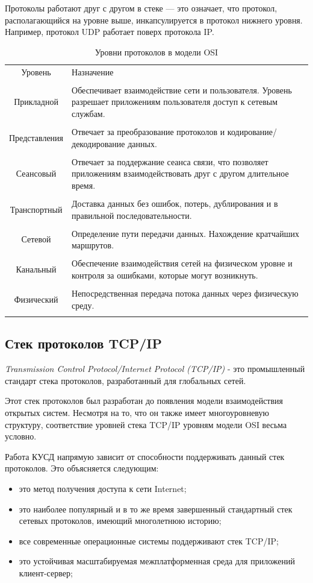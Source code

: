 Протоколы работают друг с другом в стеке --- это означает, что протокол, располагающийся на уровне выше, инкапсулируется в протокол нижнего уровня. Например, протокол UDP работает поверх протокола IP.

\begin{table}[h!]
\caption{Уровни протоколов в модели OSI}
\label{osi}
	\begin{tabular}{|c| >{\centering} m{120mm} <{\centering}|}
	\hline
	Уровень & Назначение \\
	\tabularnewline
	\hline
	Прикладной & Обеспечивает взаимодействие сети и пользователя. Уровень разрешает приложениям пользователя доступ к сетевым службам.\\
	\tabularnewline
	\hline
	Представления & Отвечает за преобразование протоколов и кодирование/декодирование данных.\\
	\tabularnewline
	\hline	
	Сеансовый & Отвечает за поддержание сеанса связи, что позволяет приложениям взаимодействовать друг с другом длительное время.\\
	\tabularnewline
	\hline
	Транспортный & Доставка данных без ошибок, потерь, дублирования и в правильной последовательности.\\
	\tabularnewline
	\hline
	Сетевой & Определение пути передачи данных. Нахождение кратчайших маршрутов.\\
	\tabularnewline
	\hline
	Канальный & Обеспечение взаимодействия сетей на физическом уровне и контроля за ошибками, которые могут возникнуть.\\
	\tabularnewline
	\hline
	Физический & Непосредственная передача потока данных через физическую среду.\\
	\tabularnewline
	\hline 
	\end{tabular}
\end{table}

\subsection{Стек протоколов TCP/IP}

\textit{Transmission Control Protocol/Internet Protocol (TCP/IP)} - это промышленный стандарт стека протоколов, разработанный для глобальных сетей\cite{tcpip}.

Этот стек протоколов был разработан до появления модели взаимодействия открытых систем. Несмотря на то, что он также имеет многоуровневую структуру, соответствие уровней стека TCP/IP уровням модели OSI весьма условно.

Работа КУСД напрямую зависит от способности поддерживать данный стек протоколов\label{reasonofwork}. Это объясняется следующим:
\begin{itemize}
\item это метод получения доступа к сети Internet;
\item это наиболее популярный и в то же время завершенный стандартный стек сетевых протоколов, имеющий многолетнюю историю;
\item все современные операционные системы поддерживают стек TCP/IP;
\item это устойчивая масштабируемая межплатформенная среда для приложений клиент-сервер;
\end{itemize}

